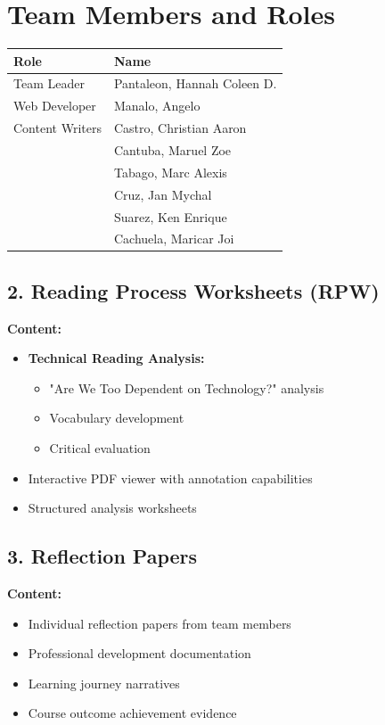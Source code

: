 \documentclass{article}
\begin{document}
\section*{Team Members and Roles}
\begin{feubox}
\begin{tabular}{p{3cm}p{8cm}}
\textbf{Role} & \textbf{Name} \\
\hline
Team Leader & Pantaleon, Hannah Coleen D. \\
Web Developer & Manalo, Angelo \\
Content Writers & Castro, Christian Aaron \\
& Cantuba, Maruel Zoe \\
& Tabago, Marc Alexis \\
& Cruz, Jan Mychal \\
& Suarez, Ken Enrique \\
& Cachuela, Maricar Joi
\end{tabular}
\end{feubox}

\subsection*{2. Reading Process Worksheets (RPW)}
\textbf{Content:}
\begin{itemize}
    \item \textbf{Technical Reading Analysis:}
    \begin{itemize}
        \item "Are We Too Dependent on Technology?" analysis
        \item Vocabulary development
        \item Critical evaluation
    \end{itemize}
    \item Interactive PDF viewer with annotation capabilities
    \item Structured analysis worksheets
\end{itemize}

\subsection*{3. Reflection Papers}
\textbf{Content:}
\begin{itemize}
    \item Individual reflection papers from team members
    \item Professional development documentation
    \item Learning journey narratives
    \item Course outcome achievement evidence
\end{itemize}
\end{document}
